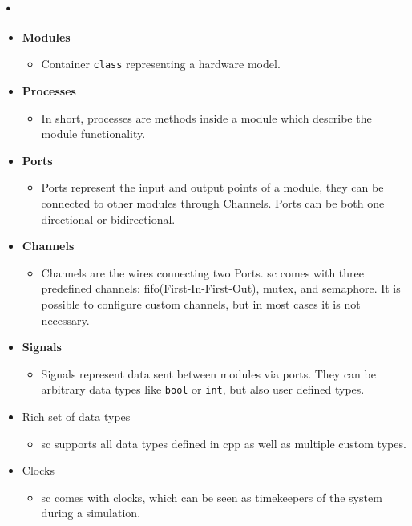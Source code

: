 \documentclass[a4paper, 12pt]{report}
\newcommand{\codeword}[1]{\texttt{#1}}
\begin{document}
\paragraph{•}
\begin{itemize}
\item \textbf{Modules}
	\begin{itemize}
		\item Container \codeword{class} representing a hardware model.
	\end{itemize}
\item \textbf{Processes}
	\begin{itemize}
		\item In short, processes are methods inside a module which describe the module functionality.
	\end{itemize}
\item \textbf{Ports}
	\begin{itemize}
		\item Ports represent the input and output points of a module, they can be connected to other modules through Channels.
		Ports can be both one directional or bidirectional.
	\end{itemize}
\item \textbf{Channels}
	\begin{itemize}
		\item Channels are the wires connecting two Ports.
		\gls{sc} comes with three predefined channels: fifo(First-In-First-Out), mutex, and semaphore.
		It is possible to configure custom channels, but in most cases it is not necessary.
	\end{itemize}
\item \textbf{Signals}
	\begin{itemize}
		\item Signals represent data sent between modules via ports.
		They can be arbitrary data types like \codeword{bool} or \codeword{int}, but also user defined types.
	\end{itemize}
\item Rich set of data types
	\begin{itemize}
		\item \gls{sc} supports all data types defined in \gls{cpp} as well as multiple custom types.
	\end{itemize}
\item Clocks
	\begin{itemize}
		\item \gls{sc} comes with clocks, which can be seen as timekeepers of the system during a simulation.
	\end{itemize}
\end{itemize}
\end{document}
